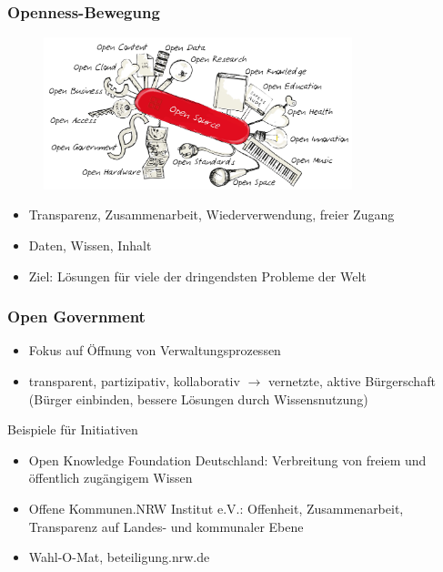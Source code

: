 \subsubsection{Openness-Bewegung}

\begin{figure}[h]
\centering
\includegraphics[width=0.8\textwidth]{assets/Open.png}
\end{figure}

\clearpage
\begin{itemize}
  \item Transparenz, Zusammenarbeit, Wiederverwendung, freier Zugang
  \item Daten, Wissen, Inhalt
  \item Ziel: Lösungen für viele der dringendsten Probleme der Welt
\end{itemize}

\subsubsection{Open Government}

\begin{itemize}
  \item Fokus auf Öffnung von Verwaltungsprozessen
  \item transparent, partizipativ, kollaborativ $\rightarrow$ vernetzte, aktive Bürgerschaft (Bürger einbinden, bessere Lösungen durch Wissensnutzung)
\end{itemize}

Beispiele für Initiativen

\begin{itemize}
  \item Open Knowledge Foundation Deutschland: Verbreitung von freiem und öffentlich zugängigem Wissen
  \item Offene Kommunen.NRW Institut e.V.: Offenheit, Zusammenarbeit, Transparenz auf Landes- und kommunaler Ebene
  \item Wahl-O-Mat, beteiligung.nrw.de
\end{itemize}

